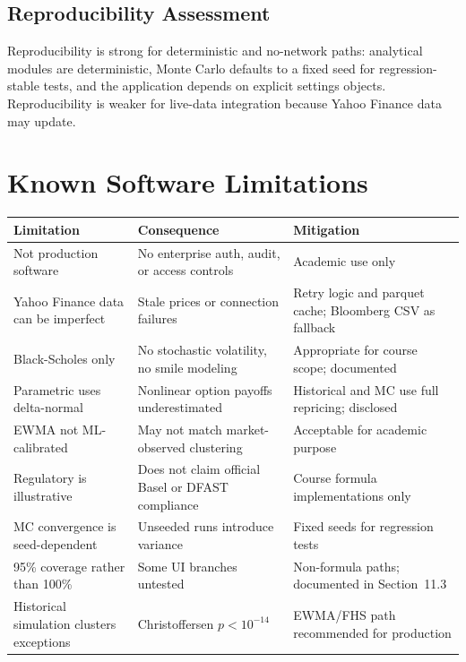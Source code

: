 \documentclass[11pt]{article}
\begin{document}
\subsection{Reproducibility Assessment}

Reproducibility is strong for deterministic and no-network paths:
analytical modules are deterministic, Monte Carlo defaults to a fixed
seed for regression-stable tests, and the application depends on
explicit settings objects.  Reproducibility is weaker for live-data
integration because Yahoo Finance data may update.

\section{Known Software Limitations}

\begin{center}
\begin{tabular}{L{4cm}L{4.5cm}L{5cm}}
\toprule
\textbf{Limitation} & \textbf{Consequence} & \textbf{Mitigation} \\
\midrule
Not production software & No enterprise auth, audit, or access controls & Academic use only \\
Yahoo Finance data can be imperfect & Stale prices or connection failures & Retry logic and parquet cache; Bloomberg CSV as fallback \\
Black-Scholes only & No stochastic volatility, no smile modeling & Appropriate for course scope; documented \\
Parametric uses delta-normal & Nonlinear option payoffs underestimated & Historical and MC use full repricing; disclosed \\
EWMA not ML-calibrated & May not match market-observed clustering & Acceptable for academic purpose \\
Regulatory is illustrative & Does not claim official Basel or DFAST compliance & Course formula implementations only \\
MC convergence is seed-dependent & Unseeded runs introduce variance & Fixed seeds for regression tests \\
95\% coverage rather than 100\% & Some UI branches untested & Non-formula paths; documented in Section~11.3 \\
Historical simulation clusters exceptions & Christoffersen $p < 10^{-14}$ & EWMA/FHS path recommended for production \\
\bottomrule
\end{tabular}
\end{center}
\end{document}
